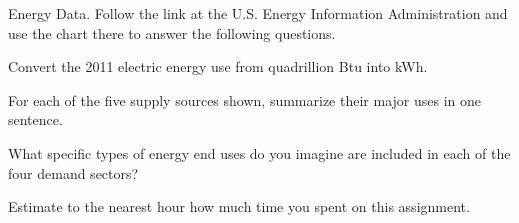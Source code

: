 \documentclass{article}
\begin{document}
\problem{} Energy Data.  Follow the link at the U.S. Energy Information
Administration and use the chart there to answer the following
questions.


\subproblem Convert the 2011 electric energy use from quadrillion Btu into kWh.

\subproblem For each of the five supply sources shown, summarize their major
    uses in one sentence.

\subproblem What specific types of energy end uses do you imagine are included
    in each of the four demand sectors?


\problem{} Estimate to the nearest hour how much time you spent on this
assignment.
\end{document}
